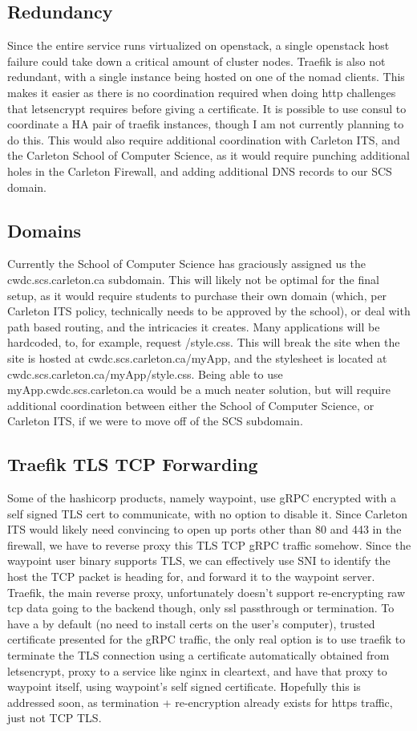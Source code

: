 \documentclass{article}
\begin{document}
\subsection{Redundancy}
Since the entire service runs virtualized on openstack, a single openstack host failure could take down a critical amount of cluster nodes. Traefik is also not redundant, with a single instance being hosted on one of the nomad clients. This makes it easier as there is no coordination required when doing http challenges that letsencrypt requires before giving a certificate. It is possible to use consul to coordinate a HA pair of traefik instances, though I am not currently planning to do this. This would also require additional coordination with Carleton ITS, and the Carleton School of Computer Science, as it would require punching additional holes in the Carleton Firewall, and adding additional DNS records to our SCS domain.
\subsection{Domains}
Currently the School of Computer Science has graciously assigned us the cwdc.scs.carleton.ca subdomain. This will likely not be optimal for the final setup, as it would require students to purchase their own domain (which, per Carleton ITS policy, technically needs to be approved by the school), or deal with path based routing, and the intricacies it creates. Many applications will be hardcoded, to, for example, request /style.css. This will break the site when the site is hosted at cwdc.scs.carleton.ca/myApp, and the stylesheet is located at cwdc.scs.carleton.ca/myApp/style.css. Being able to use myApp.cwdc.scs.carleton.ca would be a much neater solution, but will require additional coordination between either the School of Computer Science, or Carleton ITS, if we were to move off of the SCS subdomain.
\subsection{Traefik TLS TCP Forwarding}
Some of the hashicorp products, namely waypoint, use gRPC encrypted with a self signed TLS cert to communicate, with no option to disable it. Since Carleton ITS would likely need convincing to open up ports other than 80 and 443 in the firewall, we have to reverse proxy this TLS TCP gRPC traffic somehow. Since the waypoint user binary supports TLS, we can effectively use SNI to identify the host the TCP packet is heading for, and forward it to the waypoint server. Traefik, the main reverse proxy, unfortunately doesn't support re-encrypting raw tcp data going to the backend though, only ssl passthrough or termination. To have a by default (no need to install certs on the user's computer), trusted certificate presented for the gRPC traffic, the only real option is to use traefik to terminate the TLS connection using a certificate automatically obtained from letsencrypt, proxy to a service like nginx in cleartext, and have that proxy to waypoint itself, using waypoint's self signed certificate. Hopefully this is addressed soon, as termination + re-encryption already exists for https traffic, just not TCP TLS. 
\end{document}
